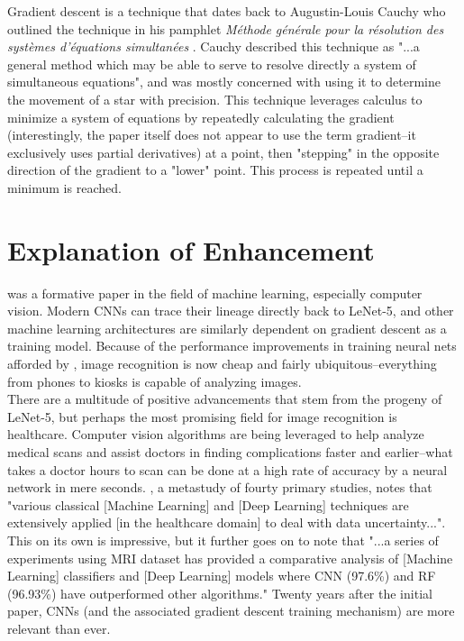 \documentclass[11pt, a4paper]{article}
\begin{document}
Gradient descent is a technique that dates back to Augustin-Louis Cauchy who outlined the technique in his pamphlet 
\textit{M\'ethode g\'en\'erale pour la r\'esolution des syst\`emes d'\'equations simultan\'ees} \cite{cauchy}. Cauchy described this technique as "...a general 
method which may be able to serve to resolve directly a system of simultaneous equations", and was mostly concerned
with using it to determine the movement of a star with precision. This technique leverages calculus to minimize a system of equations by repeatedly
calculating the gradient (interestingly, the paper itself does not appear to use the term gradient--it exclusively
uses partial derivatives) at a point, then "stepping" in the opposite direction of the gradient to a "lower" point. This 
process is repeated until a minimum is reached. 

\section{Explanation of Enhancement}
\cite{lecun} was a formative paper in the field of machine learning, especially computer vision. Modern CNNs can trace 
their lineage directly back to LeNet-5, and other machine learning architectures are similarly dependent on gradient descent 
as a training model. Because of the performance improvements in training neural nets afforded by \cite{lecun}, image 
recognition is now cheap and fairly ubiquitous--everything from phones to kiosks is capable of analyzing images. \\

There are a multitude of positive advancements that stem from the progeny of LeNet-5, but perhaps the most promising field 
for image recognition is healthcare. Computer vision algorithms are being leveraged to help analyze medical scans and assist 
doctors in finding complications faster and earlier--what takes a doctor hours to scan can be done at a high rate of accuracy
by a neural network in mere seconds. \cite{rana}, a metastudy of fourty primary studies, notes that "various 
classical [Machine Learning] and [Deep Learning] techniques are extensively applied [in the healthcare domain] to deal with 
data uncertainty...". This on its own is impressive, but it further goes on to note that "...a series of experiments using 
MRI dataset has provided a comparative analysis of [Machine Learning] classifiers and [Deep Learning] models where CNN (97.6\%) 
and RF (96.93\%) have outperformed other algorithms." \cite{rana} Twenty years after the initial paper, CNNs (and the associated 
gradient descent training mechanism) are more relevant than ever. \\
\end{document}

